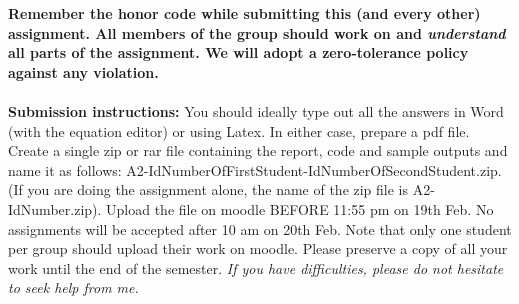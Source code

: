 \documentclass[11pt]{article}
\begin{document}
\maketitle

\textbf{Remember the honor code while submitting this (and every other) assignment. All members of the group should work on and \emph{understand} all parts of the assignment. We will adopt a \textbf{zero-tolerance policy} against any violation.}
\\
\\
\textbf{Submission instructions:} You should ideally type out all the answers in Word (with the equation editor) or using Latex. In either case, prepare a pdf file. Create a single zip or rar file containing the report, code and sample outputs and name it as follows: A2-IdNumberOfFirstStudent-IdNumberOfSecondStudent.zip. (If you are doing the assignment alone, the name of the zip file is A2-IdNumber.zip). Upload the file on moodle BEFORE 11:55 pm on 19th Feb. No assignments will be accepted after 10 am on 20th Feb. Note that only one student per group should upload their work on moodle. Please preserve a copy of all your work until the end of the semester. \emph{If you have difficulties, please do not hesitate to seek help from me.} 
\end{document}
